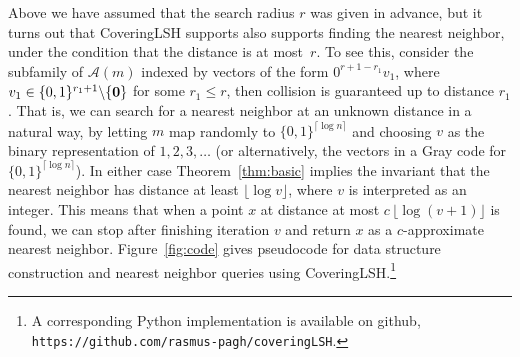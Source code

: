 \documentclass[prodmode,acmtalg]{acmsmall}
\begin{document}
Above we have assumed that the search radius $r$ was given in advance, but it turns out that CoveringLSH supports also supports finding the nearest neighbor, under the condition that the distance is at most~$r$.
To see this, consider the subfamily of $\mathcal{A}(m)$ indexed by vectors of the form $0^{r+1-r_1} v_1$, where $v_1\in \{0,1\}^{r_1+1}\backslash\{{\bf 0}\}$ for some $r_1\leq r$, then collision is guaranteed up to distance $r_1$.
That is, we can search for a nearest neighbor at an unknown distance in a natural way, by letting $m$ map randomly to $\{0,1\}^{\lceil \log n\rceil}$ and choosing $v$ as the binary representation of $1,2,3,\dots$ (or alternatively, the vectors in a Gray code for $\{0,1\}^{\lceil \log n\rceil}$).
In either case Theorem~\ref{thm:basic} implies the invariant that the nearest neighbor has distance at least $\lfloor \log v \rfloor$, where $v$ is interpreted as an integer.
This means that when a point $x$ at distance at most $c\, \lfloor \log (v+1) \rfloor$ is found, we can stop after finishing iteration $v$ and return $x$ as a $c$-approximate nearest neighbor.
Figure~\ref{fig:code} gives pseudocode for data structure construction and nearest neighbor queries using CoveringLSH.\footnote{A corresponding Python implementation is available on github, {\tt https://github.com/rasmus-pagh/coveringLSH}.}
\end{document}
